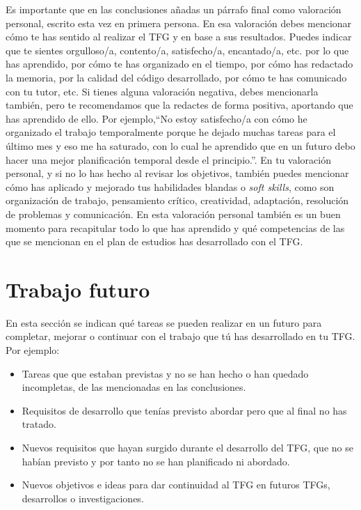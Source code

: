 Es importante que en las conclusiones añadas un párrafo final como valoración personal, escrito esta vez en primera persona. En esa valoración debes mencionar cómo te has sentido al realizar el TFG y en base a sus resultados. Puedes indicar que te sientes orgulloso/a, contento/a, satisfecho/a, encantado/a, etc. por lo que has aprendido, por cómo te has organizado en el tiempo, por cómo has redactado la memoria, por la calidad del código desarrollado, por cómo te has comunicado con tu tutor, etc. Si tienes alguna valoración negativa, debes mencionarla también, pero te recomendamos que la redactes de forma positiva, aportando que has aprendido de ello. Por ejemplo,``No estoy satisfecho/a con cómo he organizado el trabajo temporalmente porque he dejado muchas tareas para el último mes y eso me ha saturado, con lo cual he aprendido que en un futuro debo hacer una mejor planificación temporal desde el principio.''. En tu valoración personal, y si no lo has hecho al revisar los objetivos, también puedes mencionar cómo has aplicado y mejorado tus habilidades blandas o \textit{soft skills}, como son organización de trabajo, pensamiento crítico, creatividad, adaptación, resolución de problemas y comunicación. En esta valoración personal también es un buen momento para recapitular todo lo que has aprendido y qué competencias de las que se mencionan en el plan de estudios has desarrollado con el TFG.

 \section{Trabajo futuro}

 En esta sección se indican qué tareas se pueden realizar en un futuro para completar, mejorar o continuar con el trabajo que tú has desarrollado en tu TFG. Por ejemplo:
 \begin{itemize}
     \item Tareas que que estaban previstas y no se han hecho o han quedado incompletas, de las mencionadas en las conclusiones.
     \item Requisitos de desarrollo que tenías previsto abordar pero que al final no has tratado.
     \item Nuevos requisitos que hayan surgido durante el desarrollo del TFG, que no se habían previsto y por tanto no se han planificado ni abordado.
     \item Nuevos objetivos e ideas para dar continuidad al TFG en futuros TFGs, desarrollos o investigaciones.
 \end{itemize} 

